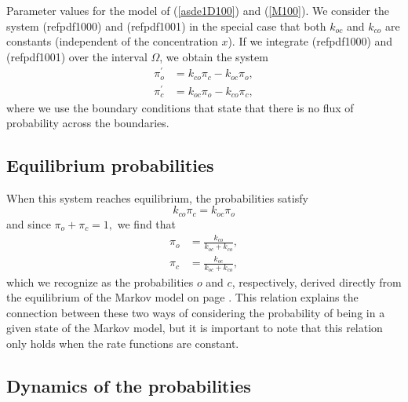 Parameter values for the model of (\ref{asde1D100}) and (\ref{M100}).
We consider the system (ref{pdf1000}) and (ref{pdf1001}) in the
special case that both $k_{oc}$ and $k_{co}$ are constants (independent of the concentration $x$). If we integrate
(ref{pdf1000}) and (ref{pdf1001}) over the interval $\Omega$, we obtain the system
\begin{align}
\pi_{o}^{\prime}  &  =k_{co}\pi_{c}-k_{oc}\pi_{o},\label{pi1}\\
\pi_{c}^{\prime}  &  =k_{oc}\pi_{o}-k_{co}\pi_{c}, \label{pi2}
\end{align}
where we use the boundary conditions that state that there is no flux
of probability across the boundaries.

\subsection{Equilibrium probabilities}


When this system reaches equilibrium, the probabilities satisfy
\begin{equation}
k_{co}\pi_{c}=k_{oc}\pi_{o}
\end{equation}
and since $\pi_{o}+\pi_{c}=1,$ we find that
\begin{align}
\pi_{o} &  =\frac{k_{co}}{k_{oc}+k_{co}},\label{eq_po}\\
\pi_{c} &  =\frac{k_{oc}}{k_{oc}+k_{co}},\label{eq_pc}
\end{align}
which we recognize as the probabilities $o$ and $c$, respectively, derived directly from the
equilibrium of the Markov model on page \pageref{eq_pr_wt}. This relation explains
the connection between these two ways of considering the probability of
being in a given state of the Markov model, but it is important to note that
this relation only holds when the rate functions are constant.



\subsection{Dynamics of the probabilities}

